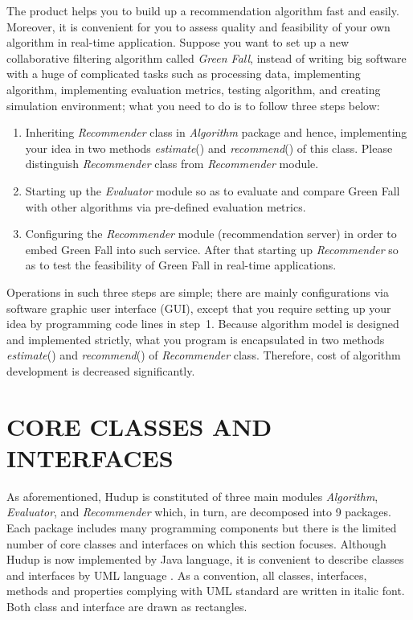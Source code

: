 \documentclass[a4paper,twoside]{article}
\begin{document}
The product helps you to build up a recommendation algorithm fast and easily. Moreover, it is convenient for you to assess quality and feasibility of your own algorithm in real-time application. Suppose you want to set up a new collaborative filtering algorithm called \textit{Green Fall}, instead of writing big software with a huge of complicated tasks such as processing data, implementing algorithm, implementing evaluation metrics, testing algorithm, and creating simulation environment; what you need to do is to follow three steps below:
\begin{enumerate}
\item Inheriting \textit{Recommender} class in \textit{Algorithm} package and hence, implementing your idea in two methods \textit{estimate}() and \textit{recommend}() of this class. Please distinguish \textit{Recommender} class from \textit{Recommender} module.
\item Starting up the \textit{Evaluator} module so as to evaluate and compare Green Fall with other algorithms via pre-defined evaluation metrics.
\item Configuring the \textit{Recommender} module (recommendation server) in order to embed Green Fall into such service. After that starting up \textit{Recommender} so as to test the feasibility of Green Fall in real-time applications.
\end{enumerate}
Operations in such three steps are simple; there are mainly configurations via software graphic user interface (GUI), except that you require setting up your idea by programming code lines in step~1. Because algorithm model is designed and implemented strictly, what you program is encapsulated in two methods \textit{estimate}() and \textit{recommend}() of \textit{Recommender} class. Therefore, cost of algorithm development is decreased significantly.

\section{\uppercase{Core Classes and Interfaces}}
\label{sec:classes}
As aforementioned, Hudup is constituted of three main modules \textit{Algorithm}, \textit{Evaluator}, and \textit{Recommender} which, in turn, are decomposed into 9 packages. Each package includes many programming components but there is the limited number of core classes and interfaces on which this section focuses. Although Hudup is now implemented by Java language, it is convenient to describe classes and interfaces by UML language \cite{duong2008}. As a convention, all classes, interfaces, methods and properties complying with UML standard are written in italic font. Both class and interface are drawn as rectangles.
\end{document}
